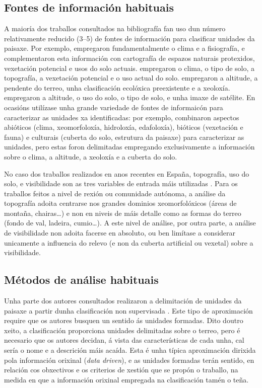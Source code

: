 \documentclass[11pt,a4paper]{article}
\begin{document}
\subsection{Fontes de información habituais}

A maioría dos traballos consultados na bibliografía fan uso dun número relativamente reducido (3--5) de fontes de información para clasificar unidades da paisaxe. Por exemplo, \citet{Capotorti2012174} empregaron fundamentalmente o clima e a fisiografía, e complementaron esta información con cartografía de espazos naturais protexidos, vexetación potencial e usos do solo actuais. \citet{Chuman2010200} empregaron o clima, o tipo de solo, a topografía, a vexetación potencial e o uso actual do solo. \citet{Soto2010720} empregaron a altitude, a pendente do terreo, unha clasificación ecolóxica preexistente e a xeoloxía. \citet{VanEetvelde2009160} empregaron a altitude, o uso do solo, o tipo de solo, e unha imaxe de satélite. En ocasións utilízase unha grande variedade de fontes de informaicón para caracterizar as unidades xa identificadas: por exemplo, \citet{Mucher201087} combinaron aspectos abióticos (clima, xeomorfoloxía, hidroloxía, edafoloxía), bióticos (vexetación e fauna) e culturais (cuberta do solo, estrutura da paisaxe) para caracterizar as unidades, pero estas foron delimitadas empregando exclusivamente a información sobre o clima, a altitude, a xeoloxía e a cuberta do solo.

No caso dos traballos realizados en anos recentes en España, topografía, uso do solo, e visibilidade son as tres variables de entrada máis utilizadas \citep{Valles2013}. Para os traballos feitos a nivel de rexión ou comunidade autónoma, a análise da topografía adoita centrarse nos grandes dominios xeomorfolóxicos (áreas de montaña, chairas\ldots) e non en niveis de máis detalle como as formas do terreo (fondo de val, ladeira, cumio\ldots). A este nivel de análise, por outra parte, a análise de visibilidade non adoita facerse en absoluto, ou ben limítase a considerar unicamente a influencia do relevo (e non da cuberta artificial ou vexetal) sobre a visibilidade.

\subsection{Métodos de análise habituais}

Unha parte dos autores consultados realizaron a delimitación de unidades da paisaxe a partir dunha clasificación non supervisada \citep{VanEetvelde2009160,Chuman2010200,Soto2010720}. Este tipo de aproximación require que os autores busquen un sentido ás unidades formadas. Dito doutro xeito, a clasificación proporciona unidades delimitadas sobre o terreo, pero é necesario que os autores decidan, á vista das características de cada unha, cal sería o nome e a descrición máis acaída. Esta é unha típica aproximación dirixida pola información orixinal (\emph{data driven}), e as unidades formadas terán sentido, en relación cos obxectivos e os criterios de xestión que se propón o traballo, na medida en que a información orixinal empregada na clasificación tamén o teña.
\end{document}
